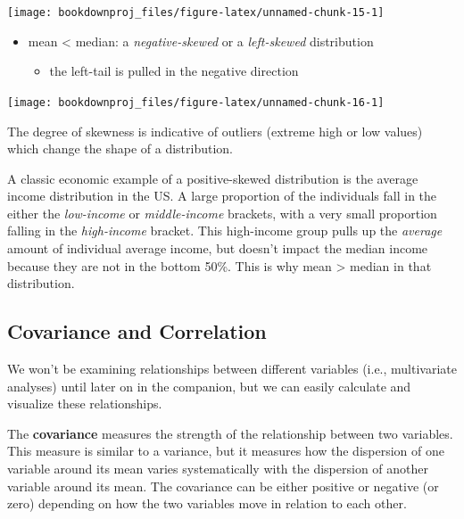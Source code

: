 \documentclass[
]{book}
\providecommand{\tightlist}{%
  \setlength{\itemsep}{0pt}\setlength{\parskip}{0pt}}
\begin{document}
\begin{center}\texttt{[image: bookdownproj\_files/figure-latex/unnamed-chunk-15-1]} \end{center}

\begin{itemize}
\item
  mean \textless{} median: a \emph{negative-skewed} or a \emph{left-skewed} distribution

  \begin{itemize}
  \tightlist
  \item
    the left-tail is pulled in the negative direction
  \end{itemize}
\end{itemize}

\begin{center}\texttt{[image: bookdownproj\_files/figure-latex/unnamed-chunk-16-1]} \end{center}

The degree of skewness is indicative of outliers (extreme high or low values) which change the shape of a distribution.

A classic economic example of a positive-skewed distribution is the average income distribution in the US. A large proportion of the individuals fall in the either the \emph{low-income} or \emph{middle-income} brackets, with a very small proportion falling in the \emph{high-income} bracket. This high-income group pulls up the \emph{average} amount of individual average income, but doesn't impact the median income because they are not in the bottom 50\%. This is why mean \textgreater{} median in that distribution.

\subsection{Covariance and Correlation}\label{covariance-and-correlation}

We won't be examining relationships between different variables (i.e., multivariate analyses) until later on in the companion, but we can easily calculate and visualize these relationships.

The \textbf{covariance} measures the strength of the relationship between two variables. This measure is similar to a variance, but it measures how the dispersion of one variable around its mean varies systematically with the dispersion of another variable around its mean. The covariance can be either positive or negative (or zero) depending on how the two variables move in relation to each other.
\end{document}
